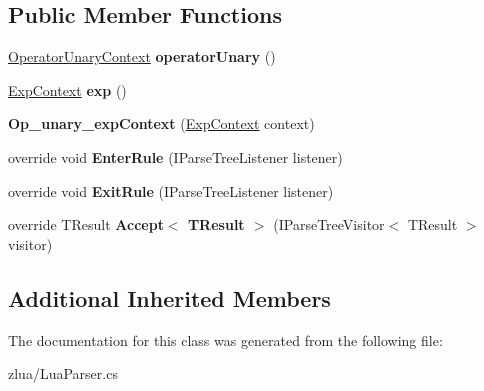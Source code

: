 \subsection*{Public Member Functions}
\begin{DoxyCompactItemize}
\item 
\mbox{\label{classzlua_1_1_lua_parser_1_1_op__unary__exp_context_a625bf9191f2b1ab8072d2a6a1f897d88}} 
\mbox{\hyperlink{classzlua_1_1_lua_parser_1_1_operator_unary_context}{Operator\+Unary\+Context}} {\bfseries operator\+Unary} ()
\item 
\mbox{\label{classzlua_1_1_lua_parser_1_1_op__unary__exp_context_abc3f30f8cd436f4fe27d8c9163959187}} 
\mbox{\hyperlink{classzlua_1_1_lua_parser_1_1_exp_context}{Exp\+Context}} {\bfseries exp} ()
\item 
\mbox{\label{classzlua_1_1_lua_parser_1_1_op__unary__exp_context_adecca304e5b45d65a75e059ff821dda9}} 
{\bfseries Op\+\_\+unary\+\_\+exp\+Context} (\mbox{\hyperlink{classzlua_1_1_lua_parser_1_1_exp_context}{Exp\+Context}} context)
\item 
\mbox{\label{classzlua_1_1_lua_parser_1_1_op__unary__exp_context_a1c80f9dacf29b40a038457c3d1831c88}} 
override void {\bfseries Enter\+Rule} (I\+Parse\+Tree\+Listener listener)
\item 
\mbox{\label{classzlua_1_1_lua_parser_1_1_op__unary__exp_context_afee71fce141ad160d596341c5b35a5ea}} 
override void {\bfseries Exit\+Rule} (I\+Parse\+Tree\+Listener listener)
\item 
\mbox{\label{classzlua_1_1_lua_parser_1_1_op__unary__exp_context_a9b6992c2e49aeefb814f0b6460c05501}} 
override T\+Result {\bfseries Accept$<$ T\+Result $>$} (I\+Parse\+Tree\+Visitor$<$ T\+Result $>$ visitor)
\end{DoxyCompactItemize}
\subsection*{Additional Inherited Members}


The documentation for this class was generated from the following file\+:\begin{DoxyCompactItemize}
\item 
zlua/Lua\+Parser.\+cs\end{DoxyCompactItemize}
